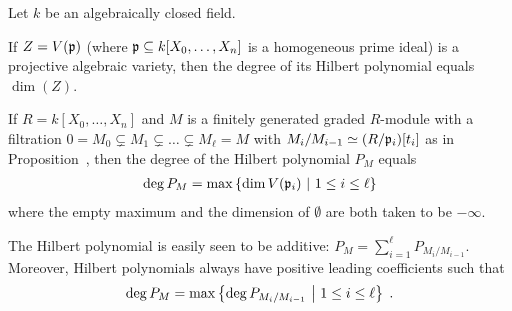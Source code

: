 \documentclass[a4paper,parskip=half,numbers=enddot, DIV=12, headheight=30pt]{scrreprt}
\begin{document}
\begin{prop}
	Let $k$ be an algebraically closed field.
    \begin{alphanumerate}
    \item 
        If $Z=V(\mathfrak{p})$ (where $\mathfrak{p}\subseteq k[X_0,\ldots, X_n]$ is a homogeneous prime ideal) is a projective algebraic variety, then the degree of its Hilbert polynomial equals $\dim(Z)$.
    \item 
        If $R=k[X_0,\ldots, X_n]$ and $M$ is a finitely generated graded $R$-module with a filtration $0=M_0\subsetneq M_1\subsetneq\ldots\subsetneq M_\ell=M$ with $M_i/M_{i-1}\simeq (R/\mathfrak{p}_i)[t_i]$ as in Proposition~, then the degree of the Hilbert polynomial $P_M$ equals
        \begin{align*}
            \deg P_M=\max\left\{\dim V(\mathfrak{p}_i)\ \middle|\  1\leq i\leq \ell\right\}
        \end{align*}
        where the empty maximum and the dimension of $\emptyset$ are both taken to be $-\infty$.
    \end{alphanumerate}
\end{prop}
\begin{rem*}
    The Hilbert polynomial is easily seen to be additive: $P_M=\sum_{i=1}^\ell P_{M_i/M_{i-1}}$. Moreover, Hilbert polynomials always have positive leading coefficients such that 
    \begin{align*}
    	\deg P_M = \max\left\{\deg P_{M_i/M_{i-1}}\ \middle|\  1\leq i\leq \ell\right\}\;.
    \end{align*}
\end{rem*}
\end{document}
